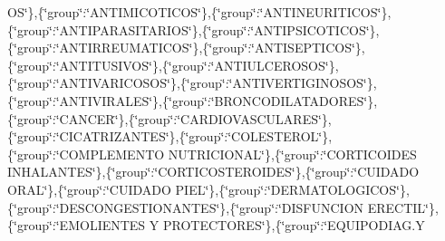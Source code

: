 O\+S\char`\"{}\},\{\char`\"{}group\char`\"{}\+:\char`\"{}\+A\+N\+T\+I\+M\+I\+C\+O\+T\+I\+C\+O\+S\char`\"{}\},\{\char`\"{}group\char`\"{}\+:\char`\"{}\+A\+N\+T\+I\+N\+E\+U\+R\+I\+T\+I\+C\+O\+S\char`\"{}\},\{\char`\"{}group\char`\"{}\+:\char`\"{}\+A\+N\+T\+I\+P\+A\+R\+A\+S\+I\+T\+A\+R\+I\+O\+S\char`\"{}\},\{\char`\"{}group\char`\"{}\+:\char`\"{}\+A\+N\+T\+I\+P\+S\+I\+C\+O\+T\+I\+C\+O\+S\char`\"{}\},\{\char`\"{}group\char`\"{}\+:\char`\"{}\+A\+N\+T\+I\+R\+R\+E\+U\+M\+A\+T\+I\+C\+O\+S\char`\"{}\},\{\char`\"{}group\char`\"{}\+:\char`\"{}\+A\+N\+T\+I\+S\+E\+P\+T\+I\+C\+O\+S\char`\"{}\},\{\char`\"{}group\char`\"{}\+:\char`\"{}\+A\+N\+T\+I\+T\+U\+S\+I\+V\+O\+S\char`\"{}\},\{\char`\"{}group\char`\"{}\+:\char`\"{}\+A\+N\+T\+I\+U\+L\+C\+E\+R\+O\+S\+O\+S\char`\"{}\},\{\char`\"{}group\char`\"{}\+:\char`\"{}\+A\+N\+T\+I\+V\+A\+R\+I\+C\+O\+S\+O\+S\char`\"{}\},\{\char`\"{}group\char`\"{}\+:\char`\"{}\+A\+N\+T\+I\+V\+E\+R\+T\+I\+G\+I\+N\+O\+S\+O\+S\char`\"{}\},\{\char`\"{}group\char`\"{}\+:\char`\"{}\+A\+N\+T\+I\+V\+I\+R\+A\+L\+E\+S\char`\"{}\},\{\char`\"{}group\char`\"{}\+:\char`\"{}\+B\+R\+O\+N\+C\+O\+D\+I\+L\+A\+T\+A\+D\+O\+R\+E\+S\char`\"{}\},\{\char`\"{}group\char`\"{}\+:\char`\"{}\+C\+A\+N\+C\+E\+R\char`\"{}\},\{\char`\"{}group\char`\"{}\+:\char`\"{}\+C\+A\+R\+D\+I\+O\+V\+A\+S\+C\+U\+L\+A\+R\+E\+S\char`\"{}\},\{\char`\"{}group\char`\"{}\+:\char`\"{}\+C\+I\+C\+A\+T\+R\+I\+Z\+A\+N\+T\+E\+S\char`\"{}\},\{\char`\"{}group\char`\"{}\+:\char`\"{}\+C\+O\+L\+E\+S\+T\+E\+R\+O\+L\char`\"{}\},\{\char`\"{}group\char`\"{}\+:\char`\"{}\+C\+O\+M\+P\+L\+E\+M\+E\+N\+T\+O N\+U\+T\+R\+I\+C\+I\+O\+N\+A\+L\char`\"{}\},\{\char`\"{}group\char`\"{}\+:\char`\"{}\+C\+O\+R\+T\+I\+C\+O\+I\+D\+E\+S I\+N\+H\+A\+L\+A\+N\+T\+E\+S\char`\"{}\},\{\char`\"{}group\char`\"{}\+:\char`\"{}\+C\+O\+R\+T\+I\+C\+O\+S\+T\+E\+R\+O\+I\+D\+E\+S\char`\"{}\},\{\char`\"{}group\char`\"{}\+:\char`\"{}\+C\+U\+I\+D\+A\+D\+O O\+R\+A\+L\char`\"{}\},\{\char`\"{}group\char`\"{}\+:\char`\"{}\+C\+U\+I\+D\+A\+D\+O P\+I\+E\+L\char`\"{}\},\{\char`\"{}group\char`\"{}\+:\char`\"{}\+D\+E\+R\+M\+A\+T\+O\+L\+O\+G\+I\+C\+O\+S\char`\"{}\},\{\char`\"{}group\char`\"{}\+:\char`\"{}\+D\+E\+S\+C\+O\+N\+G\+E\+S\+T\+I\+O\+N\+A\+N\+T\+E\+S\char`\"{}\},\{\char`\"{}group\char`\"{}\+:\char`\"{}\+D\+I\+S\+F\+U\+N\+C\+I\+O\+N E\+R\+E\+C\+T\+I\+L\char`\"{}\},\{\char`\"{}group\char`\"{}\+:\char`\"{}\+E\+M\+O\+L\+I\+E\+N\+T\+E\+S Y P\+R\+O\+T\+E\+C\+T\+O\+R\+E\+S\char`\"{}\},\{\char`\"{}group\char`\"{}\+:\char`\"{}\+E\+Q\+U\+I\+P\+O\+D\+I\+A\+G.\+Y 